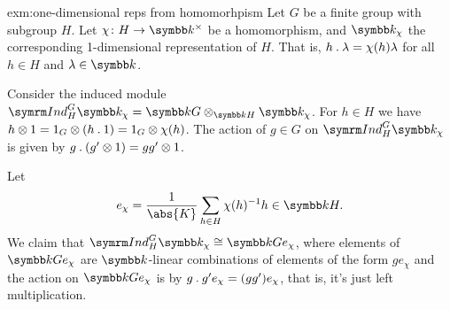 \begin{exm}{}{exm:one-dimensional reps from homomorhpism}
    Let \(G\) be a finite group with subgroup \(H\).
    Let \(\chi \colon H \to \field^{\times}\) be a homomorphism, and \(\field_\chi\) the corresponding 1-dimensional representation of \(H\).
    That is, \(h \mathbin{.} \lambda = \chi(h)\lambda\) for all \(h \in H\) and \(\lambda \in \field\).
    
    Consider the induced module \(\Ind^G_H\field_{\chi} = \field G \otimes_{\field H} \field_{\chi}\).
    For \(h \in H\) we have \(h \otimes 1 = 1_G \otimes (h \mathbin{.} 1) = 1_G \otimes \chi(h)\).
    The action of \(g \in G\) on \(\Ind^G_H \field_{\chi}\) is given by \(g \mathbin{.} (g' \otimes 1) = gg' \otimes 1\).
    
    Let
    \begin{equation}
        e_\chi = \frac{1}{\abs{K}} \sum_{h \in H} \chi(h)^{-1} h \in \field H.
    \end{equation}
    We claim that \(\Ind^G_H\field_\chi \isomorphic \field G e_\chi\), where elements of \(\field Ge_\chi\) are \(\field\)-linear combinations of elements of the form \(g e_\chi\) and the action on \(\field Ge_\chi\) is by \(g \mathbin{.} g'e_\chi = (gg')e_\chi\), that is, it's just left multiplication.
    

\end{exm}
